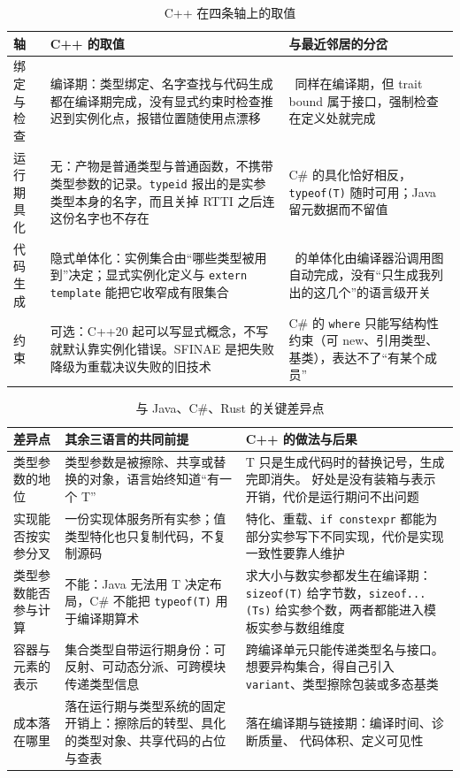 \documentclass[12pt,a4paper,fontset=fandol]{ctexbook}
\newcommand{\rustlabel}{%
  \tcbox[on line,colback=rustheadbg,colframe=rustheadbg,
    boxrule=0pt,arc=1pt,left=2pt,right=2pt,top=1pt,bottom=1pt,
    colupper=white,fontupper=\scriptsize\bfseries]{Rust}}
\newcommand{\cpp}[1]{C++#1}
\newcommand{\kw}[1]{\texttt{#1}}
\begin{document}
\begin{table}
\centering
\begin{tabularx}{0.82\textwidth}{>{\raggedright\arraybackslash}p{}
                X
                >{\raggedright\arraybackslash}p{}}
\toprule
\textbf{轴} & \textbf{\cpp{} 的取值} & \textbf{与最近邻居的分岔} \\
\midrule
绑定与检查 & 编译期：类型绑定、名字查找与代码生成都在编译期完成，没有显式约束时检查推迟到实例化点，报错位置随使用点漂移 &
\rustlabel\ 同样在编译期，但 trait bound 属于接口，强制检查在定义处就完成 \\
\addlinespace
运行期具化 & 无：产物是普通类型与普通函数，不携带类型参数的记录。\kw{typeid} 报出的是实参类型本身的名字，而且关掉 RTTI
之后连这份名字也不存在 & C\# 的具化恰好相反，\kw{typeof(T)} 随时可用；Java 留元数据而不留值 \\
\addlinespace
代码生成 & 隐式单体化：实例集合由“哪些类型被用到”决定；显式实例化定义与 \kw{extern template} 能把它收窄成有限集合 &
\rustlabel\ 的单体化由编译器沿调用图自动完成，没有“只生成我列出的这几个”的语言级开关 \\
\addlinespace
约束 & 可选：\cpp{20} 起可以写显式概念，不写就默认靠实例化错误。SFINAE 是把失败降级为重载决议失败的旧技术 & C\# 的
\kw{where} 只能写结构性约束（可 new、引用类型、基类），表达不了“有某个成员” \\
\bottomrule
\end{tabularx}
\caption{\cpp{} 在四条轴上的取值}
\end{table}

\begin{table}
\centering
\begin{tabularx}{0.82\textwidth}{>{\raggedright\arraybackslash}p{}
                >{\raggedright\arraybackslash}p{}
                X}
\toprule
\textbf{差异点} & \textbf{其余三语言的共同前提} & \textbf{\cpp{} 的做法与后果} \\
\midrule
类型参数的地位 & 类型参数是被擦除、共享或替换的对象，语言始终知道“有一个 T” & T 只是生成代码时的替换记号，生成完即消失。
好处是没有装箱与表示开销，代价是运行期问不出问题 \\
\addlinespace
实现能否按实参分叉 & 一份实现体服务所有实参；值类型特化也只复制代码，不复制源码 & 特化、重载、\kw{if constexpr}
都能为部分实参写下不同实现，代价是实现一致性要靠人维护 \\
\addlinespace
类型参数能否参与计算 & 不能：Java 无法用 T 决定布局，C\# 不能把 \kw{typeof(T)} 用于编译期算术 &
求大小与数实参都发生在编译期：\kw{sizeof(T)} 给字节数，\kw{sizeof...(Ts)} 给实参个数，两者都能进入模板实参与数组维度 \\
\addlinespace
容器与元素的表示 & 集合类型自带运行期身份：可反射、可动态分派、可跨模块传递类型信息 & 跨编译单元只能传递类型名与接口。想要异构集合，得自己引入
\kw{variant}、类型擦除包装或多态基类 \\
\addlinespace
成本落在哪里 & 落在运行期与类型系统的固定开销上：擦除后的转型、具化的类型对象、共享代码的占位与查表 & 落在编译期与链接期：编译时间、诊断质量、
代码体积、定义可见性 \\
\bottomrule
\end{tabularx}
\caption{与 Java、C\#、Rust 的关键差异点}
\end{table}
\end{document}
